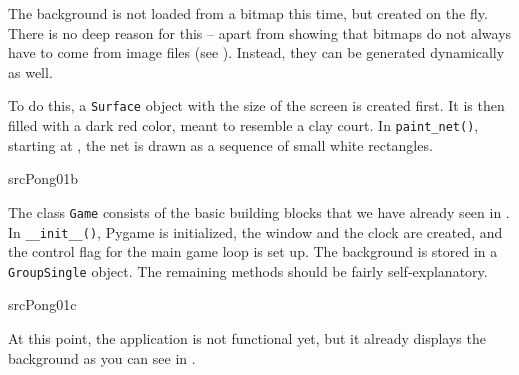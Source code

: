 \begin{figure}%
	\begin{center}%
		\vspace{-1em}%
	\end{center}%
\end{figure}%
The background is not loaded from a bitmap this time, but created on the fly. There is no deep reason for this -- apart from showing that bitmaps do not always have to come from image files (see ). Instead, they can be generated dynamically as well.

To do this, a \texttt{Surface} object with the size of the screen is created first. It is then filled with a dark red color, meant to resemble a clay court. In \texttt{paint\_net()}, starting at , the net is drawn as a sequence of small white rectangles.

{srcPong01b}

The class \texttt{Game} consists of the basic building blocks that we have already seen in . In \texttt{\_\_init\_\_()}, Pygame is initialized, the window and the clock are created, and the control flag for the main game loop is set up. The background is stored in a \texttt{Group\-Single} object. The remaining methods should be fairly self-explanatory.

{srcPong01c}

%

At this point, the application is not functional yet, but it already displays the background as you can see in .


